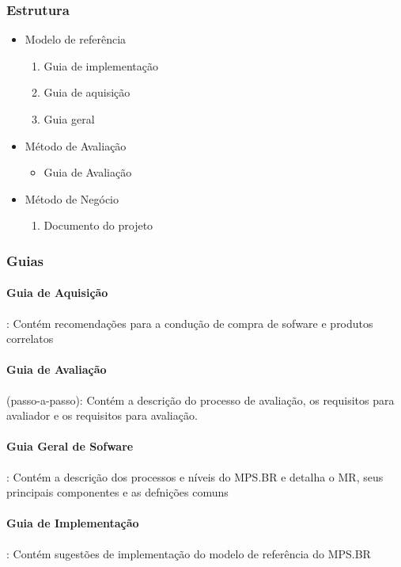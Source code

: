 \documentclass{article}
\begin{document}
\subsubsection{Estrutura}
	\begin{itemize}
	\item Modelo de referência
		\begin{enumerate}
		\item Guia de implementação
		\item Guia de aquisição
		\item Guia geral
		\end{enumerate}				
		
	\item Método de Avaliação
		\begin{itemize}		
		\item Guia de Avaliação
		\end{itemize}				

	\item Método de Negócio
		\begin{enumerate}
		\item Documento do projeto
		\end{enumerate}				
	\end{itemize}		
\subsubsection{Guias}
\paragraph{Guia de Aquisição}: Contém recomendações para a condução de compra de sofware e produtos correlatos
\paragraph{Guia de Avaliação}(passo-a-passo): Contém a descrição do processo de avaliação, os requisitos para avaliador e os requisitos para avaliação.
\paragraph{Guia Geral de Sofware} : Contém a descrição dos processos e níveis do MPS.BR e detalha o MR, seus principais componentes e as defnições comuns
\paragraph{Guia de Implementação} : Contém sugestões de implementação do modelo de referência do MPS.BR
\end{document}
